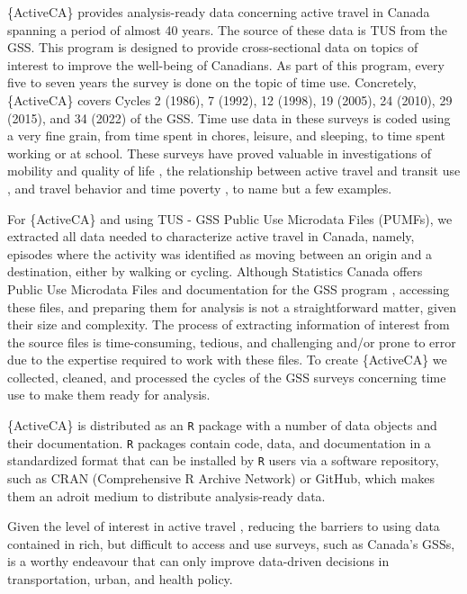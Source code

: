 \documentclass[Royal,times,sageh]{sagej}
\begin{document}
\{ActiveCA\} provides analysis-ready data concerning active travel in
Canada spanning a period of almost 40 years. The source of these data is
TUS from the GSS. This program is designed to provide cross-sectional
data on topics of interest to improve the well-being of Canadians. As
part of this program, every five to seven years the survey is done on
the topic of time use. Concretely, \{ActiveCA\} covers Cycles 2 (1986),
7 (1992), 12 (1998), 19 (2005), 24 (2010), 29 (2015), and 34 (2022) of
the GSS. Time use data in these surveys is coded using a very fine
grain, from time spent in chores, leisure, and sleeping, to time spent
working or at school. These surveys have proved valuable in
investigations of mobility and quality of life
\citep{spinneyTransport2009}, the relationship between active travel and
transit use \citep{lachapelleLonger2016}, and travel behavior and time
poverty \citep{kimFacing2024}, to name but a few examples.

For \{ActiveCA\} and using TUS - GSS Public Use Microdata Files (PUMFs),
we extracted all data needed to characterize active travel in Canada,
namely, episodes where the activity was identified as moving between an
origin and a destination, either by walking or cycling. Although
Statistics Canada offers Public Use Microdata Files and documentation
for the GSS program \citep[see][]{statisticscanada2024}, accessing these
files, and preparing them for analysis is not a straightforward matter,
given their size and complexity. The process of extracting information
of interest from the source files is time-consuming, tedious, and
challenging and/or prone to error due to the expertise required to work
with these files. To create \{ActiveCA\} we collected, cleaned, and
processed the cycles of the GSS surveys concerning time use to make them
ready for analysis.

\{ActiveCA\} is distributed as an \texttt{R} package with a number of
data objects and their documentation. \texttt{R} packages contain code,
data, and documentation in a standardized format that can be installed
by \texttt{R} users via a software repository, such as CRAN
(Comprehensive R Archive Network) or GitHub, which makes them an adroit
medium to distribute analysis-ready data.

Given the level of interest in active travel
\citep[e.g.,][]{mccurdySupport2023}, reducing the barriers to using data
contained in rich, but difficult to access and use surveys, such as
Canada's GSSs, is a worthy endeavour that can only improve data-driven
decisions in transportation, urban, and health policy.
\end{document}
